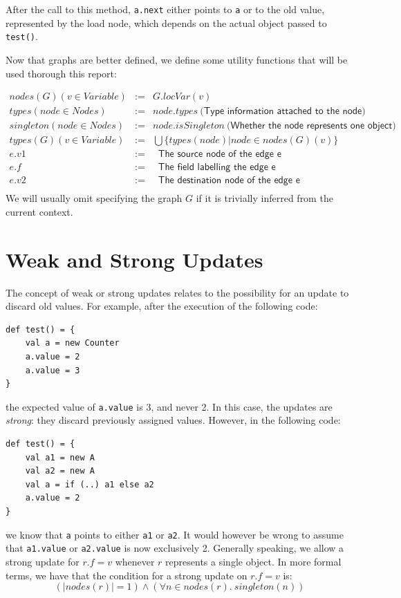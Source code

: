 After the call to this method, \verb/a.next/ either points to \verb/a/ or to
the old value, represented by the load node, which depends on the actual object
passed to \verb/test()/.

Now that graphs are better defined, we define some utility functions that will
be used thorough this report:

\begin{eqnarray*}
    nodes(G)(v \in Variable)  &:=& G.locVar(v) \\
    types(node \in Nodes)     &:=& node.types ~\textsf{(Type information attached to the node)} \\
    singleton(node \in Nodes) &:=& node.isSingleton ~\textsf{(Whether the node represents one object)} \\
    types(G)(v \in Variable)  &:=& \bigcup \{ types(node) | node \in nodes(G)(v) \} \\
    e.v1  &:=& ~\textsf{ The source node of the edge e} \\
    e.f  &:=& ~\textsf{ The field labelling the edge e} \\
    e.v2  &:=& ~\textsf{ The destination node of the edge e} \\
\end{eqnarray*}
We will usually omit specifying the graph $G$ if it is trivially inferred from
the current context.


\section{Weak and Strong Updates}
The concept of weak or strong updates relates to the possibility for an update to
discard old values. For example, after the execution of the following code:
\begin{lstlisting}
def test() = {
    val a = new Counter
    a.value = 2
    a.value = 3
}
\end{lstlisting}
the expected value of \verb/a.value/ is 3, and never 2. In this case, the
updates are \emph{strong}: they discard previously assigned values. However, in
the following code:
\begin{lstlisting}
def test() = {
    val a1 = new A
    val a2 = new A
    val a = if (..) a1 else a2
    a.value = 2
}
\end{lstlisting}
we know that \verb/a/ points to either \verb/a1/ or \verb/a2/. It would however
be wrong to assume that \verb/a1.value/ or \verb/a2.value/ is now exclusively
2. Generally speaking, we allow a strong update for $r.f = v$ whenever $r$
represents a single object. In more formal terms, we have that the condition
for a strong update on $r.f = v$ is:
$$
    (|nodes(r)| = 1) \land ( \forall n \in nodes(r).~singleton(n) )
$$

